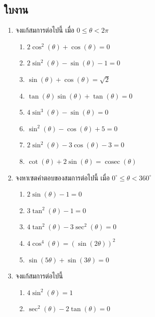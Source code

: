 \subsection*{ใบงาน}
\begin{enumerate}[label=\arabic*., leftmargin=*, itemsep=1em]
	\item จงแก้สมการต่อไปนี้ เมื่อ $0 \leq \theta < 2\pi$
	\begin{enumerate}[label=\theenumi\arabic*), leftmargin=1.5em, itemsep=0.6em]
		\everymath{\displaystyle}
		\item $2 \cos^{2} \left( \theta \right) + \cos \left( \theta \right) = 0$
		\item $2 \sin^{2} \left( \theta \right) - \sin \left( \theta \right) - 1 = 0$
		\item $\sin \left( \theta \right) + \cos \left( \theta \right) = \sqrt{2}$
		\item \label{item:tansin} $\tan \left( \theta \right) \sin \left( \theta \right) + \tan \left( \theta \right) = 0$
		\item $4 \sin^{3} \left( \theta \right) - \sin \left( \theta \right) = 0$
		\item $\sin^{2} \left( \theta \right) - \cos \left( \theta \right) + 5 = 0$
		\item $2 \sin^{2} \left( \theta \right) - 3 \cos \left( \theta \right) - 3 = 0$
		\item $\cot \left( \theta \right) + 2 \sin \left( \theta \right) = \operatorname{cosec} \left( \theta \right)$
	\end{enumerate}
	
	\item จงหาเซตคำตอบของสมการต่อไปนี้ เมื่อ $0^{\circ} \leq \theta < 360^{\circ}$
	\begin{enumerate}[label=\theenumi\arabic*), leftmargin=1.5em, itemsep=0.6em]
		\everymath{\displaystyle}
		\item $2 \sin \left( \theta \right) - 1 = 0$
		\item $3 \tan^{2} \left( \theta \right) - 1 = 0$
		\item $4 \tan^{2} \left( \theta \right) - 3 \sec^{2} \left( \theta \right) = 0$
		\item $4 \cos^{4} \left( \theta \right) = \left( \sin \left( 2\theta \right) \right)^{2}$
		\item $\sin \left( 5\theta \right) + \sin \left( 3\theta \right) = 0$
	\end{enumerate}
	
	\item จงแก้สมการต่อไปนี้
	\begin{enumerate}[label=\theenumi\arabic*), leftmargin=1.5em, itemsep=0.6em]
		\everymath{\displaystyle}
		\item $4 \sin^{2} \left( \theta \right) = 1$
		\item $\sec^{2} \left( \theta \right) - 2 \tan \left( \theta \right) = 0$
	\end{enumerate}
\end{enumerate}	
\newpage

